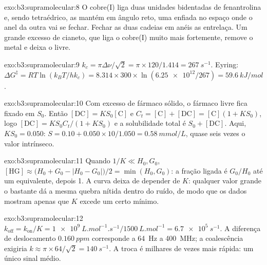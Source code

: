 \begin{solution}{exo:b3:supramolecular:8}
O cobre(I) liga duas unidades bidentadas de fenantrolina e, sendo tetraédrico, as mantém
em ângulo reto, uma enfiada no espaço onde o anel da outra vai
se fechar. Fechar as duas cadeias em anéis as entrelaça. Um grande excesso de
cianeto, que liga o cobre(I) muito mais fortemente, remove o metal e deixa
o  livre.
\end{solution}

\begin{solution}{exo:b3:supramolecular:9}
$k_c = \pi\Delta\nu/\sqrt2 = \pi \times 120/1.414 = \qty{267}{s^{-1}}$. Eyring:
$\Delta G^\ddagger = RT\ln(k_BT/hk_c) = 8.314 \times 300 \times \ln(\num{6.25e12}/267) = \qty{59.6}{kJ/mol}$.
\end{solution}

\begin{solution}{exo:b3:supramolecular:10}
Com excesso de fármaco sólido, o fármaco livre fica fixado em $S_0$. Então $[\mathrm{DC}] = KS_0[\mathrm C]$ e
$C_t = [\mathrm C] + [\mathrm{DC}] = [\mathrm C](1 + KS_0)$, logo $[\mathrm{DC}] = KS_0C_t/(1 + KS_0)$ e a solubilidade total é $S_0 + [\mathrm{DC}]$. Aqui,
$KS_0 = 0.050$: $S = 0.10 + 0.050 \times 10/1.050 = \qty{0.58}{mmol/L}$, quase seis vezes o valor intrínseco.
\end{solution}

\begin{solution}{exo:b3:supramolecular:11}
Quando $1/K \ll H_0, G_0$, $[\mathrm{HG}] \approx \bigl(H_0 + G_0 - |H_0 - G_0|\bigr)/2 = \min(H_0, G_0)$: a fração ligada é $G_0/H_0$ até um
equivalente, depois 1. A curva deixa de depender de $K$: qualquer valor grande o bastante
dá a mesma quebra nítida dentro do ruído, de modo que os dados mostram apenas que $K$ excede
um certo mínimo.
\end{solution}

\begin{solution}{exo:b3:supramolecular:12}
$k_{\mathrm{off}} = k_{\mathrm{on}}/K = \qty{1e9}{L.mol^{-1}.s^{-1}}/\qty{1500}{L.mol^{-1}} = \qty{6.7e5}{s^{-1}}$. A diferença de deslocamento
$\qty{0.160}{ppm}$ corresponde a \qty{64}{Hz} a \qty{400}{MHz}; a coalescência exigiria $k \approx \pi \times 64/\sqrt2 = \qty{140}{s^{-1}}$. A troca é
milhares de vezes mais rápida: um único sinal médio.
\end{solution}

